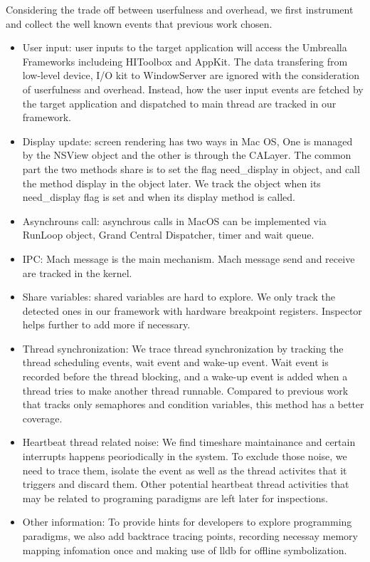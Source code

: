 Considering the trade off between userfulness and overhead, we first instrument and collect the well known events that previous work chosen.
\par \noindent
\begin{itemize}
\item User input: user inputs to the target application will access the Umbrealla Frameworks includeing HIToolbox and AppKit.
The data transfering from low-level device, I/O kit to WindowServer are ignored with the consideration of userfulness and overhead.
Instead, how the user input events are fetched by the target application and dispatched to main thread are tracked in our framework.
\item Display update: screen rendering has two ways in Mac OS, One is managed by the NSView object and the other is through the CALayer.
The common part the two methods share is to set the flag need\_display in object, and call the method display in the object later.
We track the object when its need\_display flag is set and when its display method is called.
\item Asynchrouns call: asynchrous calls in MacOS can be implemented via RunLoop object, Grand Central Dispatcher, timer and wait queue.
\item IPC: Mach message is the main mechanism.
Mach message send and receive are tracked in the kernel.
\item Share variables: shared variables are hard to explore.
We only track the detected ones in our framework with hardware breakpoint registers.
Inspector helps further to add more if necessary.
\item Thread synchronization: We trace thread synchronization by tracking the thread scheduling events, wait event and wake-up event.
Wait event is recorded before the thread blocking, and a wake-up event is added when a thread tries to make another thread runnable.
Compared to previous work that tracks only semaphores and condition variables, this method has a better coverage.
\item Heartbeat thread related noise: We find timeshare maintainance and certain interrupts happens peoriodically in the system.
To exclude those noise, we need to trace them, isolate the event as well as the thread activites that it triggers and discard them.
Other potential heartbeat thread activities that may be related to programing paradigms are left later for inspections.
\item Other information: To provide hints for developers to explore programming paradigms, we also add backtrace tracing points, recording necessay memory mapping infomation once and making use of lldb for offline symbolization.
\end{itemize}

